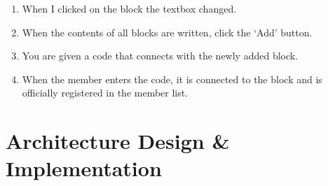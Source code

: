 \documentclass[11pt, conference]{IEEEtran}
\begin{document}
\begin{enumerate}[label=\arabic*]
\begin{enumerate}[label=\alph*]
\begin{enumerate}
\begin{enumerate}[label=\arabic*]
                \item When I clicked on the block the textbox changed.
                \item When the contents of all blocks are written, click the ‘Add’ button.
                \item You are given a code that connects with the newly added block.
                \item When the member enters the code, it is connected to the block and is officially registered in the member list.
        \end{enumerate}
        \end{enumerate}
    \end{enumerate}
\end{enumerate}

\section{\Large{Architecture Design \& Implementation}}
\end{document}
